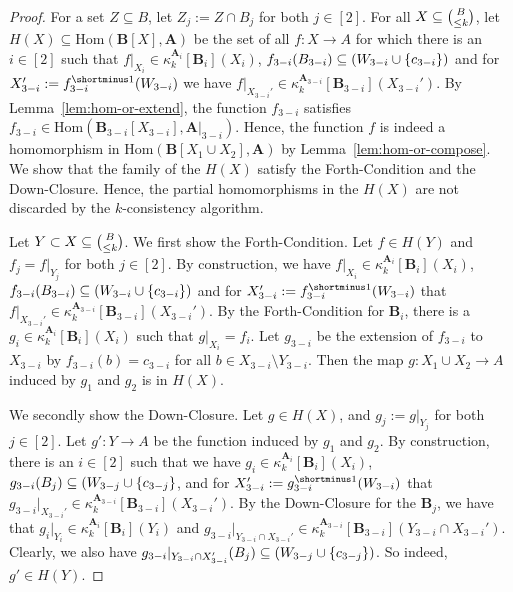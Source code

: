 \documentclass[a4paper,english, thm-restate]{lipics-v2021}
\DeclarePairedDelimiter\set{\lbrace}{\rbrace}
\newcommand{\inv}[1]{#1^{\shortminus 1}}
\newcommand{\StructA}{\mathbf{A}}
\newcommand{\StructB}{\mathbf{B}}
\newcommand{\kcol}[3]{\kappa_{#1}^{#2}[#3]}
\newcommand{\restrict}[2]{#1|_{#2}}
\newcommand{\Hom}[2]{\mathrm{Hom}(#1,#2)}
\begin{document}
	\begin{proof}
		For a set $Z \subseteq B$, let $Z_j := Z \cap B_j$ for both $j \in[2]$.
		For all $X \subseteq \tbinom{B}{\leq k}$,
		let  $H(X) \subseteq \Hom{\StructB[X]}{\StructA}$ be the set 
		of all $f \colon X \to A$ for which there is an $i\in[2]$ such that
		$\restrict{f}{X_i} \in \kcol{k}{\StructA_i}{\StructB_i}(X_i)$,
		$f_{3-i}(B_{3-i}) \subseteq (W_{3-i} \cup \set{c_{3-i}})$
		and for $X_{3-i}' := \inv{f_{3-i}}(W_{3-i})$
		we have $\restrict{f}{X_{3-i}'} \in \kcol{k}{\StructA_{3-i}}{\StructB_{3-i}}(X_{3-i}')$.
		By Lemma~\ref{lem:hom-or-extend}, the function $f_{3-i}$ satisfies
		$f_{3-i} \in \Hom{\StructB_{3-i}[X_{3-i}]}{\restrict{\StructA}{3-i}}$.
		Hence, the function $f$ is indeed a homomorphism in $\Hom{\StructB[X_1\cup X_2]}{\StructA}$
		by  Lemma~\ref{lem:hom-or-compose}.
		We show that the family of the $H(X)$ satisfy the Forth-Condition and the Down-Closure. Hence, the partial homomorphisms in the $H(X)$ are not
		discarded by the $k$-consistency algorithm.
		
		Let $Y \subset X \subseteq \tbinom{B}{\leq k}$.
		We first show the Forth-Condition.
		Let $f \in H(Y)$
		and $f_j = \restrict{f}{Y_j}$ for both $j\in[2]$.
		By construction, we have $\restrict{f}{X_i} \in \kcol{k}{\StructA_i}{\StructB_i}(X_i)$,
		$f_{3-i}(B_{3-i}) \subseteq (W_{3-i} \cup \set{c_{3-i}})$
		and for $X_{3-i}' := \inv{f_{3-i}}(W_{3-i})$ that
		$\restrict{f}{X_{3-i}'} \in \kcol{k}{\StructA_{3-i}}{\StructB_{3-i}}(X_{3-i}')$.
		By the Forth-Condition for $\StructB_i$, there is a $g_i \in  \kcol{k}{\StructA_i}{\StructB_i}(X_i)$ such that $\restrict{g}{X_i} = f_i$.
		Let $g_{3-i}$ be the extension of $f_{3-i}$ to $X_{3-i}$
		by $f_{3-i}(b) = c_{3-i}$ for all $b \in X_{3-i} \setminus Y_{3-i}$.
		Then the map $g\colon X_1\cup X_2 \to A$ induced by $g_1$ and $g_2$
		is in $H(X)$.
		
		
		We secondly show the Down-Closure.
		Let $g \in H(X)$, and $g_j := \restrict{g}{Y_j}$ for both $j \in[2]$.
		Let $g' \colon Y \to A$ be the function induced by $g_1$ and $g_2$.
		By construction, there is an $i\in[2]$ such that we have $g_i \in \kcol{k}{\StructA_i}{\StructB_i}(X_i)$,
		$g_{3-i}(B_j) \subseteq (W_{3-j} \cup \set{c_{3-j}}$,
		and for $X_{3-i}' := \inv{g_{3-i}}(W_{3-i})$ that
		$\restrict{g_{3-i}}{X_{3-i}'} \in \kcol{k}{\StructA_{3-i}}{\StructB_{3-i}}(X_{3-i}')$.
		By the Down-Closure for the $\StructB_j$,
		we have that $\restrict{g_i}{Y_i} \in \kcol{k}{\StructA_i}{\StructB_i}(Y_i)$
		and $\restrict{g_{3-i}}{Y_{3-i} \cap X_{3-i}'} \in \kcol{k}{\StructA_{3-i}}{\StructB_{3-i}}(Y_{3-i} \cap X_{3-i}')$.
		Clearly, we also have $\restrict{g_{3-i}}{Y_{3-i} \cap X_{3-i}'}(B_j) \subseteq (W_{3-j} \cup \set{c_{3-j}})$.
		So indeed, $g' \in H(Y)$.	
	\end{proof}
	
\end{document}
